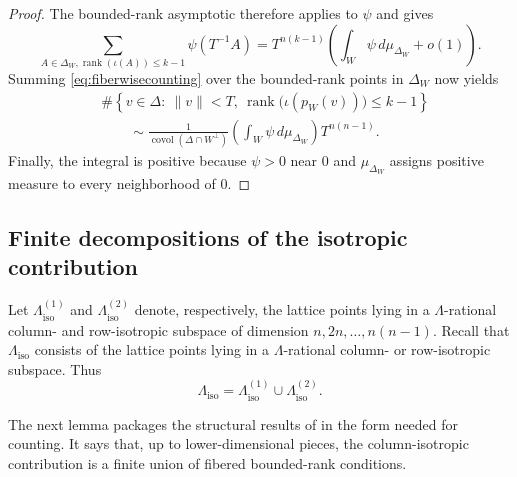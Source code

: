 \documentclass[reqno,11pt]{amsart}
\numberwithin{equation}{section}
\theoremstyle{definition}
\theoremstyle{remark}
\newcommand{\op}{\operatorname}
\newcommand{\rank}{\op{rank}}
\begin{document}
\begin{proof}
The bounded-rank asymptotic therefore applies to $\psi$ and gives
$$
\sum_{{A\in\Delta_W,
\rank(\iota(A))\le k-1}}
\psi(T^{-1}A)
=
T^{n(k-1)}
\left(
\int_W\psi\,d\mu_{\Delta_W}+o(1)
\right).
$$
Summing \eqref{eq:fiberwisecounting} over the bounded-rank points in
$\Delta_W$ now yields
$$
\begin{aligned}
&\#\left\{
v\in\Delta:\ \|v\|<T,\
\rank\bigl(\iota(p_W(v))\bigr)\le k-1
\right\}\\
&\qquad\sim
\frac{1}{\operatorname{covol}(\Delta\cap W^\perp)}
\left(\int_W\psi\,d\mu_{\Delta_W}\right)
T^{n(n-1)}.
\end{aligned}
$$
Finally, the integral is positive because $\psi>0$ near $0$ and
$\mu_{\Delta_W}$ assigns positive measure to every neighborhood of
$0$.
\end{proof}


\subsection{Finite decompositions of the isotropic contribution}

Let $\Lambda_{\operatorname{iso}}^{(1)}$ and
$\Lambda_{\operatorname{iso}}^{(2)}$ denote, respectively, the lattice
points lying in a $\Lambda$-rational column- and row-isotropic subspace of
dimension $n,2n,\ldots,n(n-1)$. Recall that
$\Lambda_{\operatorname{iso}}$ consists of the lattice points lying in a
$\Lambda$-rational column- or row-isotropic subspace. Thus
\begin{equation}\label{eq:isotropic-union-column-row}
\Lambda_{\operatorname{iso}}
=
\Lambda_{\operatorname{iso}}^{(1)}\cup\Lambda_{\operatorname{iso}}^{(2)}.
\end{equation}

The next lemma packages the structural results of  in the
form needed for counting.  It says that, up to lower-dimensional pieces, the
column-isotropic contribution is a finite union of fibered bounded-rank
conditions.
\end{document}
